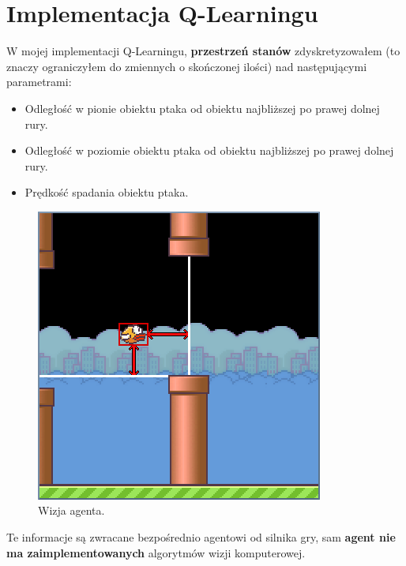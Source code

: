 \documentclass[a4paper, 12pt,oneside]{book}
\begin{document}
\section{Implementacja Q-Learningu}
W mojej implementacji Q-Learningu, \textbf{przestrzeń stanów} zdyskretyzowałem
(to znaczy ograniczyłem do zmiennych o skończonej ilości) nad następującymi
parametrami:
\begin{itemize}
	\setlength\itemsep{-0.4em}
	\item Odległość w pionie obiektu ptaka od obiektu najbliższej po prawej
		dolnej rury.
	\item Odległość w poziomie obiektu ptaka od obiektu najbliższej po 
		prawej dolnej rury.
	\item Prędkość spadania obiektu ptaka.
\end{itemize}
\begin{figure}[!htb]
	\begin{center}
	\includegraphics[scale=0.50]{agent_vision.png}
	\end{center}
	\caption{Wizja agenta.}
	\label{agent_vision}
\end{figure}

Te informacje są zwracane bezpośrednio agentowi od silnika gry, sam 
\textbf{agent nie ma zaimplementowanych} algorytmów wizji komputerowej.
\end{document}
